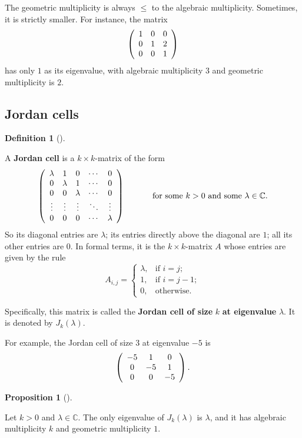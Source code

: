 \documentclass[numbers=enddot,12pt,final,onecolumn,notitlepage]{scrartcl}%
\numberwithin{exer}{subsection}
\theoremstyle{definition}
\newtheorem{prop}[theo]{Proposition}
\newenvironment{proposition}[1][]
{\begin{prop}[#1]\begin{leftbar}}
{\end{leftbar}\end{prop}}
\newtheorem{defi}[theo]{Definition}
\newenvironment{definition}[1][]
{\begin{defi}[#1]\begin{leftbar}}
{\end{leftbar}\end{defi}}
\begin{document}
The geometric multiplicity is always $\leq$ to the algebraic multiplicity.
Sometimes, it is strictly smaller. For instance, the matrix%
\[
\left(
\begin{array}
[c]{ccc}%
1 & 0 & 0\\
0 & 1 & 2\\
0 & 0 & 1
\end{array}
\right)
\]
has only $1$ as its eigenvalue, with algebraic multiplicity $3$ and geometric
multiplicity is $2$.

\subsection{Jordan cells}

\begin{definition}
A \textbf{Jordan cell} is a $k\times k$-matrix of the form%
\[
\left(
\begin{array}
[c]{ccccc}%
\lambda & 1 & 0 & \cdots & 0\\
0 & \lambda & 1 & \cdots & 0\\
0 & 0 & \lambda & \cdots & 0\\
\vdots & \vdots & \vdots & \ddots & \vdots\\
0 & 0 & 0 & \cdots & \lambda
\end{array}
\right)  \ \ \ \ \ \ \ \ \ \ \text{for some }k>0\text{ and some }\lambda
\in\mathbb{C}.
\]
So its diagonal entries are $\lambda$; its entries directly above the diagonal
are $1$; all its other entries are $0$. In formal terms, it is the $k\times
k$-matrix $A$ whose entries are given by the rule%
\[
A_{i,j}=%
\begin{cases}
\lambda, & \text{if }i=j;\\
1, & \text{if }i=j-1;\\
0, & \text{otherwise.}%
\end{cases}
\]


Specifically, this matrix is called the \textbf{Jordan cell of size }$k$
\textbf{at eigenvalue }$\lambda$. It is denoted by $J_{k}\left(
\lambda\right)  $.
\end{definition}

For example, the Jordan cell of size $3$ at eigenvalue $-5$ is%
\[
\left(
\begin{array}
[c]{ccc}%
-5 & 1 & 0\\
0 & -5 & 1\\
0 & 0 & -5
\end{array}
\right)  .
\]


\begin{proposition}
Let $k>0$ and $\lambda\in\mathbb{C}$. The only eigenvalue of $J_{k}\left(
\lambda\right)  $ is $\lambda$, and it has algebraic multiplicity $k$ and
geometric multiplicity $1$.
\end{proposition}
\end{document}
